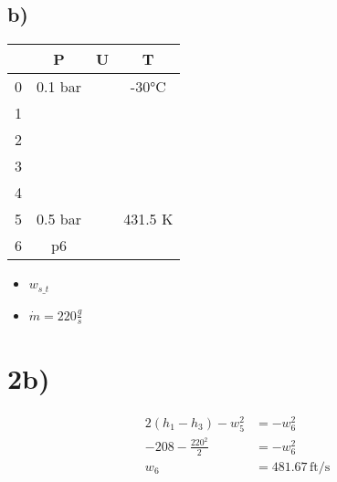 

\subsection*{b)}

\begin{tabular}{|c|c|c|c|}
    \hline
    & P & U & T \\
    \hline
    0 & 0.1 bar & & -30°C \\
    \hline
    1 & & & \\
    \hline
    2 & & & \\
    \hline
    3 & & & \\
    \hline
    4 & & & \\
    \hline
    5 & 0.5 bar & & 431.5 K \\
    \hline
    6 & p6 & & \\
    \hline
\end{tabular}

\begin{itemize}
    \item \( w_{s\_t} \)
    \item \(\dot{m} = 220 \frac{g}{s} \)
\end{itemize}



\section*{2b)}

\begin{align*}
2(h_1 - h_3) - w_5^2 &= -w_6^2 \\
-208 - \frac{220^2}{2} &= -w_6^2 \\
w_6 &= 481.67 \, \text{ft}/\text{s}
\end{align*}